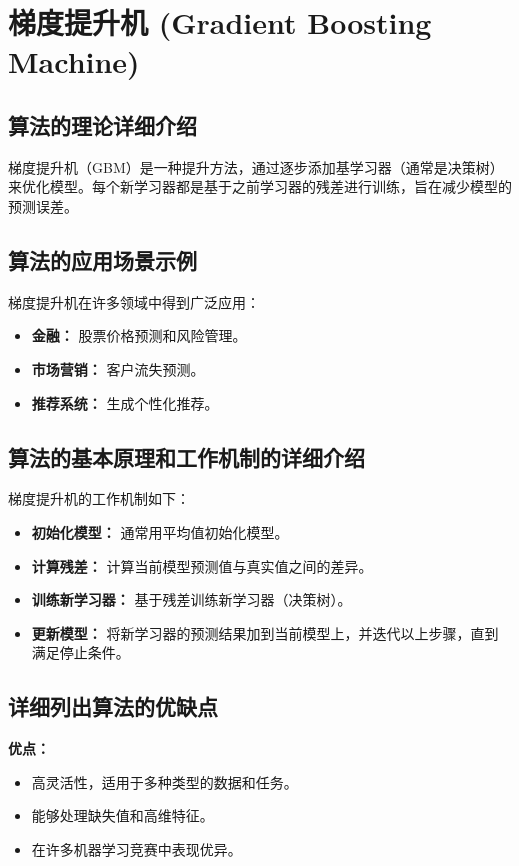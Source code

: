 \section{梯度提升机 (Gradient Boosting Machine)}
\subsection*{算法的理论详细介绍}
梯度提升机（GBM）是一种提升方法，通过逐步添加基学习器（通常是决策树）来优化模型。每个新学习器都是基于之前学习器的残差进行训练，旨在减少模型的预测误差。

\subsection*{算法的应用场景示例}
梯度提升机在许多领域中得到广泛应用：
\begin{itemize}
    \item \textbf{金融：} 股票价格预测和风险管理。
    \item \textbf{市场营销：} 客户流失预测。
    \item \textbf{推荐系统：} 生成个性化推荐。
\end{itemize}

\subsection*{算法的基本原理和工作机制的详细介绍}
梯度提升机的工作机制如下：
\begin{itemize}
    \item \textbf{初始化模型：} 通常用平均值初始化模型。
    \item \textbf{计算残差：} 计算当前模型预测值与真实值之间的差异。
    \item \textbf{训练新学习器：} 基于残差训练新学习器（决策树）。
    \item \textbf{更新模型：} 将新学习器的预测结果加到当前模型上，并迭代以上步骤，直到满足停止条件。
\end{itemize}

\subsection*{详细列出算法的优缺点}
\textbf{优点：}
\begin{itemize}
    \item 高灵活性，适用于多种类型的数据和任务。
    \item 能够处理缺失值和高维特征。
    \item 在许多机器学习竞赛中表现优异。
\end{itemize}

